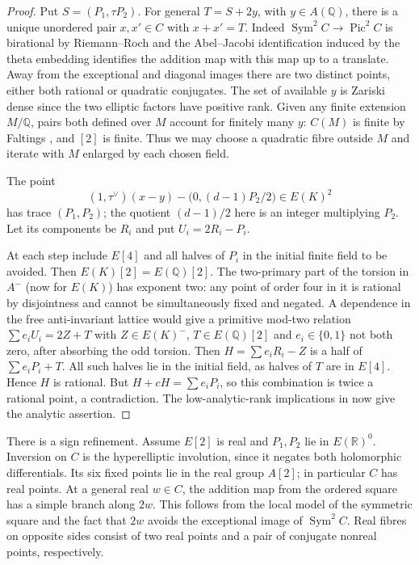 \documentclass[11pt]{article}
\newcommand{\Q}{\mathbb Q}\newcommand{\F}{\mathbb F}\newcommand{\Z}{\mathbb Z}
\begin{document}
\begin{proof}
Put $S=(P_1,\tau P_2)$. For general $T=S+2y$, with $y\in A(\Q)$, there is a unique unordered pair $x,x'\in C$ with $x+x'=T$. Indeed $\operatorname{Sym}^2 C\to \operatorname{Pic}^2 C$ is birational by Riemann--Roch and the Abel--Jacobi identification induced by the theta embedding identifies the addition map with this map up to a translate. Away from the exceptional and diagonal images there are two distinct points, either both rational or quadratic conjugates. The set of available $y$ is Zariski dense since the two elliptic factors have positive rank. Given any finite extension $M/\Q$, pairs both defined over $M$ account for finitely many $y$: $C(M)$ is finite by Faltings \cite{faltings}, and $[2]$ is finite. Thus we may choose a quadratic fibre outside $M$ and iterate with $M$ enlarged by each chosen field.

The point
\[
 (1,\tau^\vee)(x-y)-
 \bigl(0,(d-1)P_2/2\bigr)\in E(K)^2
\]
has trace $(P_1,P_2)$; the quotient $(d-1)/2$ here is an integer multiplying $P_2$. Let its components be $R_i$ and put $U_i=2R_i-P_i$.

At each step include $E[4]$ and all halves of $P_i$ in the initial finite field to be avoided. Then $E(K)[2]=E(\Q)[2]$. The two-primary part of the torsion in $A^-$ (now for $E(K)$) has exponent two: any point of order four in it is rational by disjointness and cannot be simultaneously fixed and negated. A dependence in the free anti-invariant lattice would give a primitive mod-two relation
$\sum e_iU_i=2Z+T$ with $Z\in E(K)^-$, $T\in E(\Q)[2]$ and $e_i\in\{0,1\}$ not both zero, after absorbing the odd torsion. Then $H=\sum e_iR_i-Z$ is a half of $\sum e_iP_i+T$. All such halves lie in the initial field, as halves of $T$ are in $E[4]$. Hence $H$ is rational. But $H+cH=\sum e_iP_i$, so this combination is twice a rational point, a contradiction. The low-analytic-rank implications in \cite{wiles} now give the analytic assertion.
\end{proof}

There is a sign refinement. Assume $E[2]$ is real and $P_1,P_2$ lie in $E(\mathbb R)^0$. Inversion on $C$ is the hyperelliptic involution, since it negates both holomorphic differentials. Its six fixed points lie in the real group $A[2]$; in particular $C$ has real points. At a general real $w\in C$, the addition map from the ordered square has a simple branch along $2w$. This follows from the local model of the symmetric square and the fact that $2w$ avoids the exceptional image of $\operatorname{Sym}^2 C$. Real fibres on opposite sides consist of two real points and a pair of conjugate nonreal points, respectively.
\end{document}
